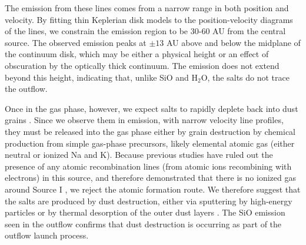 \documentclass[12pt]{article}
\newcommand{\water}{H$_{2}$O\xspace}		%
\begin{document}

The emission from these lines comes
from a narrow range in both position and velocity.  By fitting thin Keplerian
disk models to the position-velocity diagrams of the lines, we constrain the
emission region to be 30-60 AU from the central source.  The observed emission
peaks at $\pm13$ AU above and below the midplane of the continuum disk, which
may be either a physical height or an effect of obscuration by the optically
thick continuum.  The emission does not extend beyond this height, indicating
that, unlike SiO and \water, the salts do not trace the outflow.


Once in the gas phase, however, we expect salts to rapidly deplete back into
dust grains \cite{Cherchneff2012a}.  Since we observe them in emission, with
narrow velocity line profiles, they must be released into the gas phase either
by grain destruction by chemical production from simple gas-phase
precursors, likely elemental atomic gas (either neutral or ionized Na and K).
Because previous studies have ruled out the presence of any atomic
recombination lines (from atomic ions recombining with electrons) in this
source, and therefore demonstrated that there is no ionized gas around Source I
\cite{Plambeck2016a,Baez-Rubio2018a}, we reject the atomic formation route. We
therefore suggest that the salts are produced by dust destruction, either
via sputtering by high-energy particles \cite{Schilke1997a} or by thermal
desorption of the outer dust layers \cite{Decin2016a}.  The SiO emission seen
in the outflow confirms that dust destruction is occurring as part of the outflow
launch process.


\end{document}
